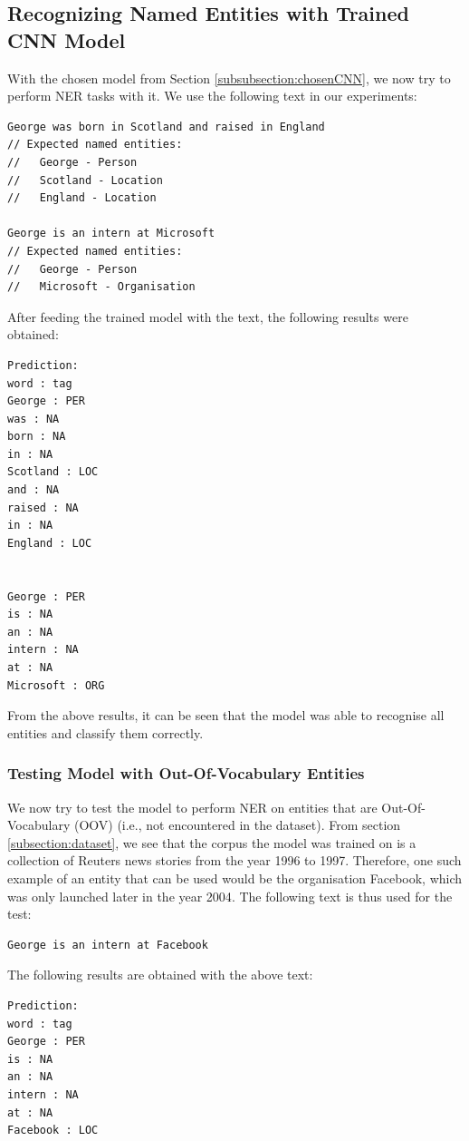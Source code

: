 \documentclass[sigconf,nonacm=true]{acmart}
\begin{document}
\subsection{Recognizing Named Entities with Trained CNN Model}
With the chosen model from Section \ref{subsubsection:chosenCNN}, we now try to perform NER tasks with it. We use the following text in our experiments:

\begin{lstlisting}
George was born in Scotland and raised in England
// Expected named entities: 
//   George - Person
//   Scotland - Location
//   England - Location

George is an intern at Microsoft
// Expected named entities:
//   George - Person
//   Microsoft - Organisation
\end{lstlisting}

After feeding the trained model with the text, the following results were obtained:
\begin{lstlisting}
Prediction:
word : tag
George : PER
was : NA
born : NA
in : NA
Scotland : LOC
and : NA
raised : NA
in : NA
England : LOC


George : PER
is : NA
an : NA
intern : NA
at : NA
Microsoft : ORG
\end{lstlisting}

From the above results, it can be seen that the model was able to recognise all entities and classify them correctly. 

\subsubsection{Testing Model with Out-Of-Vocabulary Entities}
We now try to test the model to perform NER on entities that are Out-Of-Vocabulary (OOV) (i.e., not encountered in the dataset). From section \ref{subsection:dataset}, we see that the corpus the model was trained on is a collection of Reuters news stories from the year 1996 to 1997. Therefore, one such example of an entity that can be used would be the organisation Facebook, which was only launched later in the year 2004\cite{rothman_2015}. The following text is thus used for the test:

\begin{lstlisting}
George is an intern at Facebook
\end{lstlisting}
\pagebreak
The following results are obtained with the above text:

\begin{lstlisting}
Prediction:
word : tag
George : PER
is : NA
an : NA
intern : NA
at : NA
Facebook : LOC
\end{lstlisting}
\end{document}
